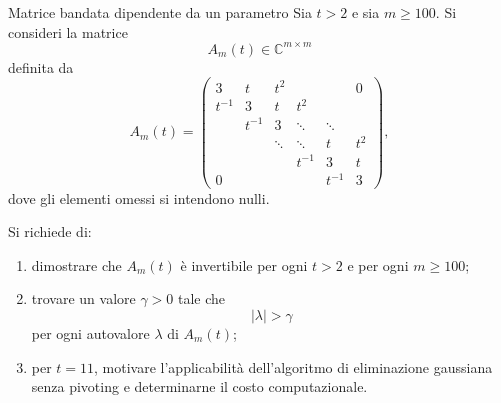 \documentclass[a4paper]{article}
\begin{document}
\begin{snippetexercise}{Matrice bandata dipendente da un parametro}
    Sia \(t>2\) e sia \(m\geq 100\). Si consideri la matrice
    \[
        A_m(t)\in \mathbb{C}^{m\times m}
    \]
    definita da
    \[
        A_m(t)=
        \begin{pmatrix}
            3 & t & t^2 & & & 0\\
            t^{-1} & 3 & t & t^2 & & \\
            & t^{-1} & 3 & \ddots & \ddots & \\
            & & \ddots & \ddots & t & t^2\\
            & & & t^{-1} & 3 & t\\
            0 & & & & t^{-1} & 3
        \end{pmatrix},
    \]
    dove gli elementi omessi si intendono nulli.

    Si richiede di:
    \begin{enumerate}
        \item dimostrare che \(A_m(t)\) è invertibile per ogni \(t>2\) e per ogni \(m\geq 100\);
        \item trovare un valore \(\gamma>0\) tale che
            \[
                |\lambda|>\gamma
            \]
            per ogni autovalore \(\lambda\) di \(A_m(t)\);
        \item per \(t=11\), motivare l'applicabilità dell'algoritmo di eliminazione gaussiana senza pivoting e determinarne il costo computazionale.
    \end{enumerate}
\end{snippetexercise}
\end{document}
